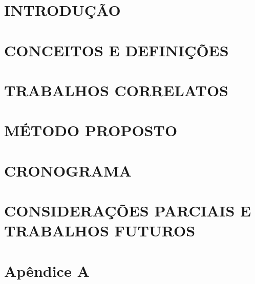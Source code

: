 \documentclass[
	12pt,				%
    oneside,			%
	a4paper,			%
	chapter=TITLE,		%
	english,			%
	brazil				%
	]{abntex2}
\begin{document}
\chapter{INTRODUÇÃO}

\chapter{CONCEITOS E DEFINIÇÕES}

\chapter{TRABALHOS CORRELATOS}

\chapter{MÉTODO PROPOSTO}

\chapter{CRONOGRAMA}

%
\chapter{CONSIDERAÇÕES PARCIAIS E TRABALHOS FUTUROS}

\chapter{Apêndice A}


%
\end{document}
